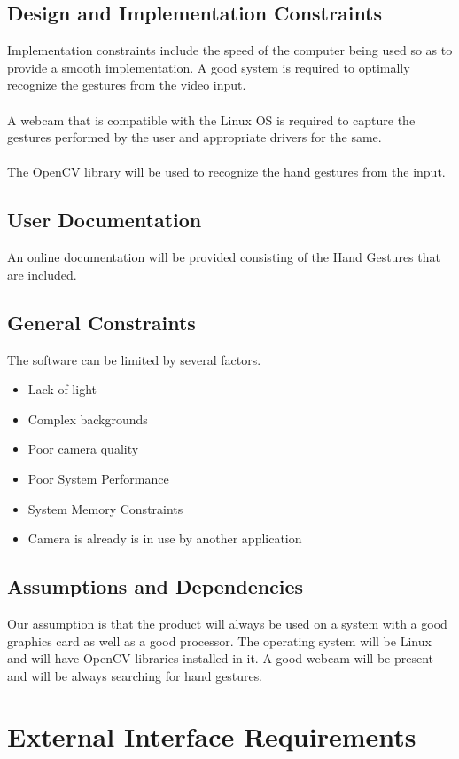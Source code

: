 \documentclass[11pt]{report}
\begin{document}
\subsection{Design and Implementation Constraints}
Implementation constraints include the speed of the computer being used so as to provide a smooth implementation. A good system is required to optimally recognize the gestures from the video input. 
\\
\\A webcam that is compatible with the Linux OS is required to capture the gestures performed by the user and appropriate drivers for the same.
\\
\\The OpenCV library will be used to recognize the hand gestures from the input.


\subsection{User Documentation}
An online documentation will be provided consisting of the Hand Gestures that are included.

\subsection{General Constraints}
The software can be limited by several factors.
\begin{itemize}
    \item Lack of light
    \item Complex backgrounds
    \item Poor camera quality
    \item Poor System Performance
    \item System Memory Constraints
    \item Camera is already is in use by another application
\end{itemize}

\subsection{Assumptions and Dependencies}
Our assumption is that the product will always be used on a system with a good graphics card as well as a good processor. The operating system will be Linux and will have OpenCV libraries installed in it.
A good webcam will be present and will be always searching for hand gestures.



\newpage
\section{External Interface Requirements}
\end{document}
